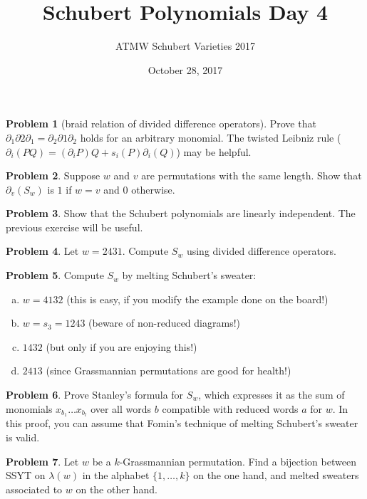\documentclass{amsart}
\newcommand{\+}[1]{\ensuremath{\mathbf{#1}}}
\theoremstyle{definition}
\newtheorem{prob}{Problem}
\begin{document}
\title{Schubert Polynomials Day 4}
\date{October 28, 2017}
\author{ATMW Schubert Varieties 2017}

\maketitle

\begin{prob}[braid relation of divided difference operators]
 Prove that $\partial_1 \partial{2} \partial_1 = \partial_{2} \partial{1} \partial_{2}$
 holds for an arbitrary monomial.  The twisted Leibniz rule ($\partial_i(PQ) = (\partial_i P)Q + s_i(P)\partial_i(Q)$) may be helpful.
\end{prob}


\begin{prob}
 Suppose $w$ and $v$ are permutations with the same length.
 Show that $\partial_v(S_w)$ is $1$ if $w=v$ and $0$ otherwise.
\end{prob}

\begin{prob}
 Show that the Schubert polynomials are linearly independent.  The previous exercise will
 be useful.
\end{prob}



\begin{prob}
 Let $w = 2431$.  Compute $S_w$ using divided difference operators.
\end{prob}

\begin{prob}
Compute $S_w$ by melting Schubert's sweater:
\begin{enumerate}[(a)]
 \item $w = 4132$ (this is easy, if you modify the example done on the board!)
 \item $w = s_3 = 1243$ (beware of non-reduced diagrams!)
 \item $1432$ (but only if you are enjoying this!)
 \item $2413$ (since Grassmannian permutations are good for health!)
\end{enumerate}
\end{prob}

\begin{prob}
 Prove Stanley's formula for $S_w$, which expresses
 it as the sum of monomials $x_{b_1}\ldots x_{b_l}$ over all words $b$ compatible with reduced words $a$ for $w$.
 In this proof, you can assume that Fomin's technique of melting Schubert's sweater is valid.
\end{prob}

\begin{prob}
Let $w$ be a $k$-Grassmannian permutation. Find a bijection between SSYT on $\lambda(w)$ in the
alphabet $\{1, \ldots, k\}$
on the one hand,
and melted sweaters associated to $w$ on the other hand.
\end{prob}
\end{document}

